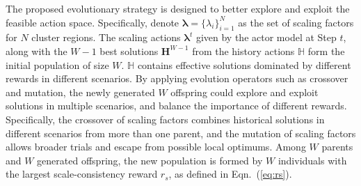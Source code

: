 \documentclass[letterpaper]{article} %
\newcommand\blue[1]{\textcolor{blue}{#1}}
\newcommand\rbb[1]{\textcolor{red}{\{RB: #1\}}}
\newcommand\rjf[1]{\textcolor{red}{\{RJF: #1\}}}
\newcommand\qz[1]{\textcolor{blue}{\{QZ: #1\}}}
\begin{document}


The proposed evolutionary strategy is designed to better explore and exploit the feasible action space.
Specifically, denote $\bm{\lambda} = \{\lambda_i\}_{i=1}^{N}$ as the set of scaling factors for $N$ cluster regions.
The scaling actions %
$\bm{\lambda}^{t}$ given by the actor model at Step $t$, along with the $W-1$ best solutions $\bm{H}^{W-1}$ from the history actions $\mathbb{H}$ form the initial population of size $W$. $\mathbb{H}$ contains effective solutions dominated by different rewards in different scenarios. By applying evolution operators such as crossover and mutation, the newly generated $W$ offspring could explore and exploit solutions in multiple scenarios, and balance the importance of different rewards. %
Specifically, the crossover of scaling factors %
combines historical solutions in different scenarios from more than one parent, and the mutation of scaling factors allows broader trials and escape from possible local optimums. %
Among $W$ parents and $W$ generated offspring, %
the new population is formed by $W$ individuals with the largest scale-consistency reward $r_s$, as defined in Eqn.~(\ref{eq:rs}). %
\end{document}

